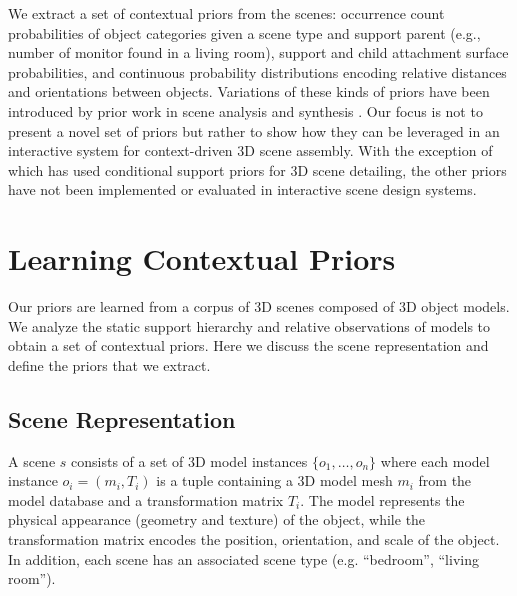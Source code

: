 \documentclass{sigchi}
\begin{document}
We extract a set of contextual priors from the scenes: occurrence count probabilities of object categories given a scene type and support parent (e.g., number of monitor found in a living room), support and child attachment surface probabilities, and continuous probability distributions encoding relative distances and orientations between objects.  Variations of these kinds of priors have been introduced by prior work in scene analysis and synthesis \cite{fisher2012example,yu2014clutterpalette,chang2014spatial}.  Our focus is not to present a novel set of priors but rather to show how they can be leveraged in an interactive system for context-driven 3D scene assembly.  With the exception of \cite{yu2014clutterpalette} which has used conditional support priors for 3D scene detailing, the other priors have not been implemented or evaluated in interactive scene design systems.


\section{Learning Contextual Priors}

Our priors are learned from a corpus of 3D scenes composed of 3D object models.  We analyze the static support hierarchy and relative observations of models to obtain a set of contextual priors.  Here we discuss the scene representation and define the priors that we extract.


\subsection{Scene Representation}
A scene $s$ consists of a set of 3D model instances $\{o_1,\ldots,o_n\}$ where each model instance $o_i = (m_i, T_i)$ is a tuple containing a 3D model mesh $m_i$ from the model database and a transformation matrix $T_i$.  The model represents the physical appearance (geometry and texture) of the object, while the transformation matrix encodes the position, orientation, and scale of the object.  In addition, each scene has an associated scene type (e.g. ``bedroom'', ``living room'').
\end{document}
